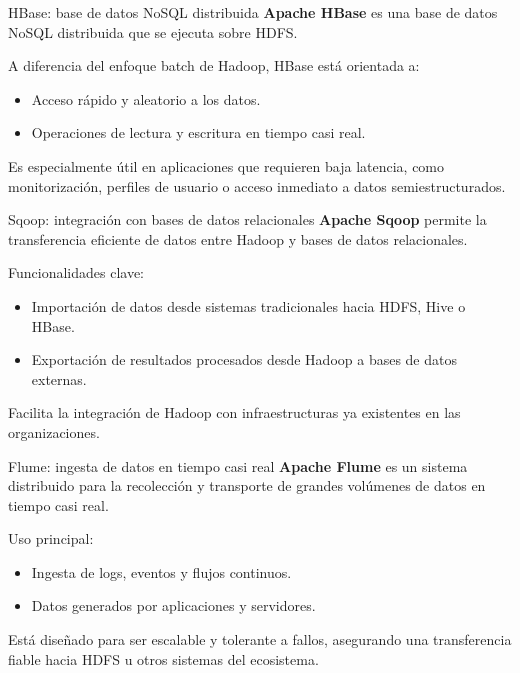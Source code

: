 \documentclass{beamer}
\begin{document}
\begin{frame}{HBase: base de datos NoSQL distribuida}
\textbf{Apache HBase} es una base de datos NoSQL distribuida que se ejecuta sobre HDFS.

A diferencia del enfoque batch de Hadoop, HBase está orientada a:
\begin{itemize}
    \item Acceso rápido y aleatorio a los datos.
    \item Operaciones de lectura y escritura en tiempo casi real.
\end{itemize}

Es especialmente útil en aplicaciones que requieren baja latencia, como monitorización, perfiles de usuario o acceso inmediato a datos semiestructurados.
\end{frame}

\begin{frame}{Sqoop: integración con bases de datos relacionales}
\textbf{Apache Sqoop} permite la transferencia eficiente de datos entre Hadoop y bases de datos relacionales.

Funcionalidades clave:
\begin{itemize}
    \item Importación de datos desde sistemas tradicionales hacia HDFS, Hive o HBase.
    \item Exportación de resultados procesados desde Hadoop a bases de datos externas.
\end{itemize}

Facilita la integración de Hadoop con infraestructuras ya existentes en las organizaciones.
\end{frame}

\begin{frame}{Flume: ingesta de datos en tiempo casi real}
\textbf{Apache Flume} es un sistema distribuido para la recolección y transporte de grandes volúmenes de datos en tiempo casi real.

Uso principal:
\begin{itemize}
    \item Ingesta de logs, eventos y flujos continuos.
    \item Datos generados por aplicaciones y servidores.
\end{itemize}

Está diseñado para ser escalable y tolerante a fallos, asegurando una transferencia fiable hacia HDFS u otros sistemas del ecosistema.
\end{frame}
\end{document}
